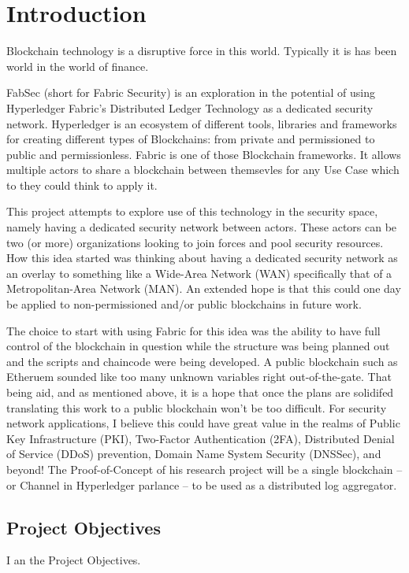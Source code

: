 \section{Introduction}
	\hspace{10mm}Blockchain technology is a disruptive force in this world. Typically it is has been world in the world of finance.
	
	\hspace{10mm}FabSec (short for Fabric Security) is an exploration in the potential of using Hyperledger Fabric's Distributed Ledger Technology as a dedicated security network. Hyperledger is an ecosystem of different tools, libraries and frameworks for creating different types of Blockchains: from private and permissioned to public and permissionless. Fabric is one of those Blockchain frameworks. It allows multiple actors to share a blockchain between themsevles for any Use Case which to they could think to apply it.
	
	\hspace{10mm}This project attempts to explore use of this technology in the security space, namely having a dedicated security network between actors. These actors can be two (or more) organizations looking to join forces and pool security resources. How this idea started was thinking about having a dedicated security network as an overlay to something like a Wide-Area Network (WAN) specifically that of a Metropolitan-Area Network (MAN). An extended hope is that this could one day be applied to non-permissioned and/or public blockchains in future work.
	
	\hspace{10mm}The choice to start with using Fabric for this idea was the ability to have full control of the blockchain in question while the structure was being planned out and the scripts and chaincode were being developed. A public blockchain such as Etheruem sounded like too many unknown variables right out-of-the-gate. That being aid, and as mentioned above, it is a hope that once the plans are solidifed translating this work to a public blockchain won't be too difficult. For security network applications, I believe this could have great value in the realms of Public Key Infrastructure (PKI), Two-Factor Authentication (2FA), Distributed Denial of Service (DDoS) prevention, Domain Name System Security (DNSSec), and beyond! The Proof-of-Concept of his research project will be a single blockchain -- or Channel in Hyperledger parlance -- to be used as a distributed log aggregator.
	
	\subsection{Project Objectives}
		\hspace{10mm} I an the Project Objectives.
